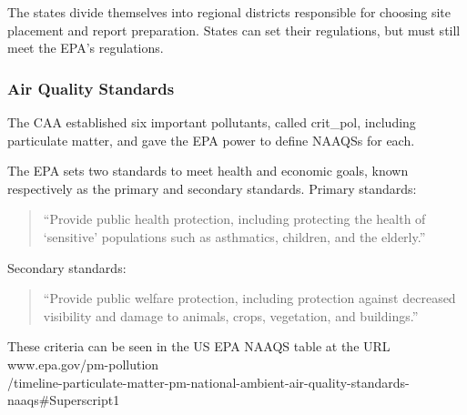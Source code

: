 The states divide themselves into regional districts responsible for choosing site placement and report preparation.  States can set their regulations, but must still meet the \ac{EPA}'s regulations. 

\subsubsection{Air Quality Standards}\label{subsubsec:aqs}
The \ac{CAA} established six important pollutants, called \gls{crit_pol}, 
including particulate matter, and gave the \ac{EPA} power to define \acp{NAAQS} for each.

The \ac{EPA} sets two standards to meet health and economic goals, known respectively as the primary and secondary standards.  Primary standards:
\begin{quote}
	``Provide public health protection, including protecting the health of `sensitive' populations such as asthmatics, children, and the elderly.'' 
\end{quote}
Secondary standards:
\begin{quote}
	``Provide public welfare protection, including protection against decreased visibility and damage to animals, crops, vegetation, and buildings.''  
\end{quote}
These criteria can be 
seen in the US EPA NAAQS table
at the URL\\
www.epa.gov/pm-pollution \\/timeline-particulate-matter-pm-national-ambient-air-quality-standards-naaqs\#Superscript1

